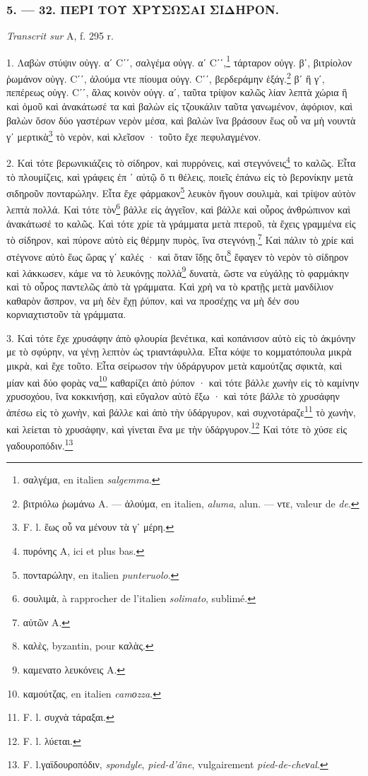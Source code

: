 \documentclass[a4paper, 11pt, oneside, polutonikogreek, french]{article}
\begin{document}
\subsubsection{5. --- 32. ΠΕΡΙ ΤΟΥ ΧΡΥΣΩΣΑΙ ΣΙΔΗΡΟΝ.}

\emph{Transcrit sur} A, f. 295 r.

\bigskip

1. Λαβὼν στύψιν οὐγγ. αʹ Cʹʹ, σαλγέμα οὐγγ. αʹ Cʹʹ,\footnote{σαλγέμα, en italien \emph{salgemma}.} τάρταρον οὐγγ. βʹ, βιτρίολον ῥωμάνον οὐγγ. Cʹʹ, ἀλούμα ντε πίουμα οὐγγ. Cʹʹ, βερδεράμην ἑξάγ.\footnote{βιτριόλω ῥωμάνω A. --- ἀλούμα, en italien, \emph{aluma}, alun. --- ντε, valeur de \emph{de}.} βʹ ἢ γʹ, πεπέρεως οὐγγ. Cʹʹ, ἅλας κοινὸν οὐγγ. αʹ, ταῦτα τρίψον καλῶς λίαν λεπτὰ χώρια ἢ καὶ ὁμοῦ καὶ ἀνακάτωσέ τα καὶ βαλὼν εἰς τζουκάλιν ταῦτα γανωμένον, ἀφόριον, καὶ βαλὼν ὅσον δύο γαστέρων νερὸν μέσα, καὶ βαλὼν ἵνα βράσουν ἕως οὗ να μὴ νουντὰ γʹ μερτικὰ\footnote{F. l. ἕως οὗ να μένουν τὰ γʹ μέρη.} τὸ νερὸν, καὶ κλεῖσον · τοῦτο ἔχε πεφυλαγμένον.

2. Καὶ τότε βερωνικιάζεις τὸ σίδηρον, καὶ πυρρόνεις, καὶ στεγνόνεις\footnote{πυρόνης A, ici et plus bas.} το καλῶς. Εἶτα τὸ πλουμίζεις, καὶ γράφεις ἐπ ᾽ αὐτῷ ὅ τι θέλεις, ποιεῖς ἐπάνω εἰς τὸ βερονίκην μετὰ σιδηροῦν πονταρώλην. Εἶτα ἔχε φάρμακον\footnote{πονταρώλην, en italien \emph{punteruolo}.} λευκὸν ἤγουν σουλιμὰ, καὶ τρίψον αὐτὸν λεπτὰ πολλά. Καὶ τότε τὸν\footnote{σουλιμὰ, à rapprocher de l'italien \emph{solimato}, sublimé.} βάλλε εἰς ἀγγεῖον, καὶ βάλλε καὶ οὖρος ἀνθρώπινον καὶ ἀνακάτωσέ το καλῶς. Καὶ τότε χρίε τὰ γράμματα μετὰ πτεροῦ, τὰ ἔχεις γραμμένα εἰς τὸ σίδηρον, καὶ πύρονε αὐτὸ εἰς θέρμην πυρὸς, ἵνα στεγνόνῃ.\footnote{αὐτῶν A.} Καὶ πάλιν τὸ χρίε καὶ στέγνονε αὐτὸ ἕως ὥρας γʹ καλές · καὶ ὅταν ἴδῃς ὅτι\footnote{καλὲς, byzantin, pour καλὰς.} ἔφαγεν τὸ νερὸν τὸ σίδηρον καὶ λάκκωσεν, κάμε να τὸ λευκόνῃς πολλὰ\footnote{καμενατο λευκόνεις A.} δυνατὰ, ὥστε να εὐγάλῃς τὸ φαρμάκην καὶ τὸ οὖρος παντελῶς ἀπὸ τὰ γράμματα. Καὶ χρὴ να τὸ κρατῇς μετὰ μανδίλιον καθαρὸν ἄσπρον, να μὴ δὲν ἔχῃ ῥύπον, καὶ να προσέχῃς να μὴ δέν σου κορνιαχτιστοῦν τὰ γράμματα.

3. Καὶ τότε ἔχε χρυσάφην ἀπὸ φλουρία βενέτικα, καὶ κοπάνισον αὐτὸ εἰς τὸ ἀκμόνην με τὸ σφύρην, να γένῃ λεπτὸν ὡς τριαντάφυλλα. Εἶτα κόψε το κομματόπουλα μικρὰ μικρὰ, καὶ ἔχε τοῦτο. Εἶτα σείρωσον τὴν ὑδράργυρον μετὰ καμούτζας σφικτὰ, καὶ μίαν καὶ δύο φορὰς να\footnote{καμούτζας, en italien \emph{camοzza}.} καθαρίζει ἀπὸ ῥύπον · καὶ τότε βάλλε χωνὴν εἰς τὸ καμίνην χρυσοχόου, ἵνα κοκκινήσῃ, καὶ εὔγαλον αὐτὸ ἔξω · καὶ τότε βάλλε τὸ χρυσάφην ἀπέσω εἰς τὸ χωνὴν, καὶ βάλλε καὶ ἀπὸ τὴν ὑδάργυρον, καὶ συχνοτάραζε\footnote{F. l. συχνὰ τάραξαι.} τὸ χωνὴν, καὶ λείεται τὸ χρυσάφην, καὶ γίνεται ἕνα με τὴν ὑδάργυρον.\footnote{F. l. λύεται.} Καὶ τότε τὸ χύσε εἰς γαδουροπόδιν.\footnote{F. l.γαϊδουροπόδιν, \emph{spondyle}, \emph{pied-d'âne}, vulgairement \emph{pied-de-cheνal}.}
\end{document}
